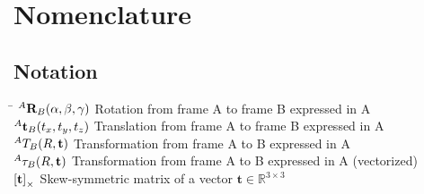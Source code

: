 \begin{abstract}
\lipsum[1-3]
\end{abstract}

\chapter*{Nomenclature}\label{ch:symbols}

\section*{Notation}
\label{sec:notation}

\begin{tabbing}
	\hspace*{3.0cm}		\= \kill
	$^A\mathbf{R}_{B}(\alpha, \beta, \gamma)$ \> Rotation from frame A to frame B expressed in A \\[0.75ex]
	$^A\mathbf{t}_{B}(t_x,t_y,t_z)$ \> Translation from frame A to frame B expressed in A  \\[0.75ex]
	$^{A}T_{B}(R,\mathbf{t})$ \> Transformation from frame A to B expressed in A  \\[0.75ex]
	$\t2v{A}{B}(R,\trans)$ \> Transformation from frame A to B expressed in A (vectorized) \\[0.75ex]
	${\left[\mathbf{t}\right]}_\times$ \> Skew-symmetric matrix of a vector $\mathbf{t} \in \mathbb{R}^{3\times3}$
\end{tabbing}

